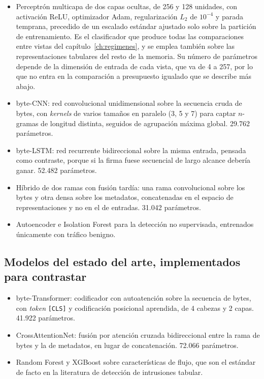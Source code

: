 \begin{itemize}
  \item Perceptrón multicapa de dos capas ocultas, de 256 y 128 unidades, con
        activación ReLU, optimizador Adam, regularización $L_2$ de $10^{-4}$ y
        parada temprana, precedido de un escalado estándar ajustado solo sobre
        la partición de entrenamiento. Es el clasificador que produce todas las
        comparaciones entre vistas del capítulo~\ref{ch:regimenes}, y se emplea
        también sobre las representaciones tabulares del resto de la memoria.
        Su número de parámetros depende de la dimensión de entrada de cada
        vista, que va de 4 a 257, por lo que no entra en la comparación a
        presupuesto igualado que se describe más abajo.
  \item byte-CNN: red convolucional unidimensional sobre la secuencia cruda de
        bytes, con \emph{kernels} de varios tamaños en paralelo (3, 5 y 7) para
        captar $n$-gramas de longitud distinta, seguidos de agrupación máxima
        global. 29.762 parámetros.
  \item byte-LSTM: red recurrente bidireccional sobre la misma entrada, pensada
        como contraste, porque si la firma fuese secuencial de largo alcance
        debería ganar. 52.482 parámetros.
  \item Híbrido de dos ramas con fusión tardía: una rama convolucional sobre los
        bytes y otra densa sobre los metadatos, concatenadas en el espacio de
        representaciones y no en el de entradas. 31.042 parámetros.
  \item Autoencoder e Isolation Forest para la detección no supervisada,
        entrenados únicamente con tráfico benigno.
\end{itemize}

\subsection*{Modelos del estado del arte, implementados para contrastar}

\begin{itemize}
  \item byte-Transformer: codificador con autoatención sobre la secuencia de
        bytes, con \emph{token} \texttt{[CLS]} y codificación posicional
        aprendida, de 4 cabezas y 2 capas. 41.922 parámetros.
  \item CrossAttentionNet: fusión por atención cruzada bidireccional entre la
        rama de bytes y la de metadatos, en lugar de concatenación. 72.066
        parámetros.
  \item Random Forest y XGBoost \cite{Chen2016} sobre características de flujo,
        que son el estándar de facto en la literatura de detección de intrusiones
        tabular.
\end{itemize}

